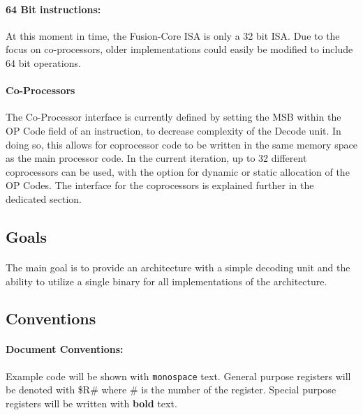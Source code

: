 \documentclass[letterpaper, 11pt]{article}
\begin{document}
\paragraph{64 Bit instructions:}At this moment in time, the Fusion-Core ISA is only a 32 bit ISA. Due to the focus on co-processors,
older implementations could easily be modified to include 64 bit operations.
\paragraph{Co-Processors}The Co-Processor interface is currently defined by setting the MSB within the OP Code field of 
an instruction, to decrease complexity of the Decode unit. In doing so, this allows for coprocessor code to be written in the same memory space as the main processor code. In the current iteration, up to 32 different coprocessors can be used, with the option for dynamic or static allocation of the OP Codes. The interface for the coprocessors is explained further in the dedicated section.

\subsection{Goals}
\paragraph{}The main goal is to provide an architecture with a simple decoding unit and the ability to utilize a single binary for all implementations of the architecture.
\subsection{Conventions}
\paragraph{Document Conventions:}Example code will be shown with \texttt{monospace} text. General purpose registers will be denoted with
\$R\# where \# is the number of the register. Special purpose registers will be written with \textbf{bold} text.
\end{document}
